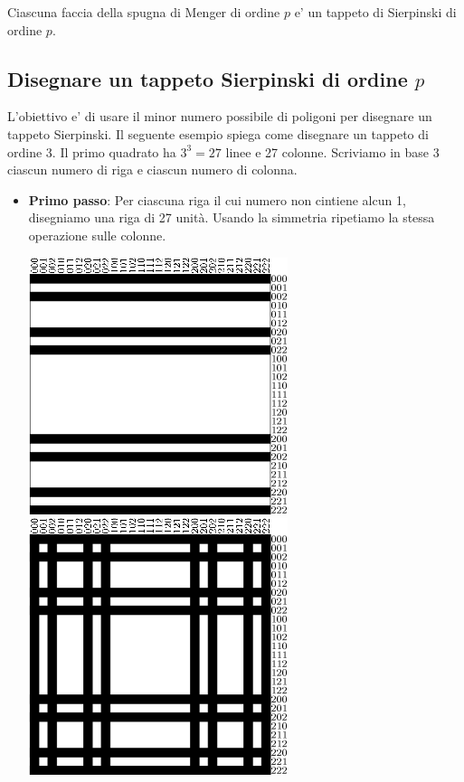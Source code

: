 Ciascuna faccia della spugna di Menger di ordine $p$ e' un tappeto di Sierpinski di ordine $p$.


\subsection{Disegnare un tappeto Sierpinski di ordine $p$}
L'obiettivo e' di usare il minor numero possibile di poligoni per disegnare un tappeto Sierpinski. Il seguente esempio spiega come disegnare un tappeto di ordine 3. Il primo quadrato ha $3^3=27$ linee e 27 colonne. Scriviamo in base 3 ciascun numero di riga e ciascun numero di colonna.
\begin{itemize}
	\item [\textbullet]\textbf{Primo passo}: Per ciascuna riga il cui numero non cintiene alcun 1, disegniamo una riga di 27 unità. Usando la simmetria ripetiamo la stessa operazione sulle colonne.\\
	\begin{center}
		\includegraphics{pics/menger-schema02.png}
		\includegraphics{pics/menger-schema03.png}
	\end{center}

\end{itemize}
